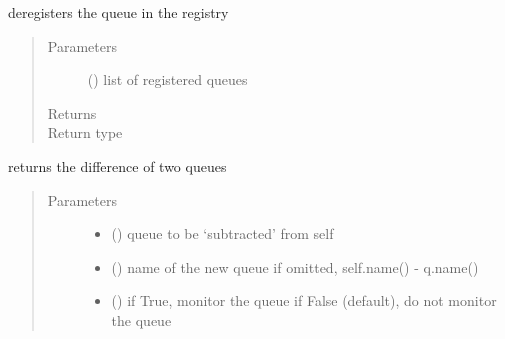 \documentclass[letterpaper,10pt,english]{sphinxmanual}
\begin{document}
\begin{fulllineitems}

\begin{fulllineitems}
\label{\detokenize{Reference:salabim.Queue.deregister}}
deregisters the queue in the registry
\begin{quote}\begin{description}
\item[{Parameters}] \leavevmode
{} () \textendash{} list of registered queues

\item[{Returns}] \leavevmode
{}

\item[{Return type}] \leavevmode
{\hyperref[\detokenize{Reference:salabim.Queue}]{}}

\end{description}\end{quote}

\end{fulllineitems}


\begin{fulllineitems}
\label{\detokenize{Reference:salabim.Queue.difference}}
returns the difference of two queues
\begin{quote}\begin{description}
\item[{Parameters}] \leavevmode\begin{itemize}
\item {} 
 ({\hyperref[\detokenize{Reference:salabim.Queue}]{}}) \textendash{} queue to be ‘subtracted’ from self

\item {} 
 () \textendash{} name of the  new queue 
if omitted, self.name() - q.name()

\item {} 
 () \textendash{} if True, monitor the queue 
if False (default), do not monitor the queue


\end{itemize}
\end{description}
\end{quote}
\end{fulllineitems}
\end{fulllineitems}
\end{document}
